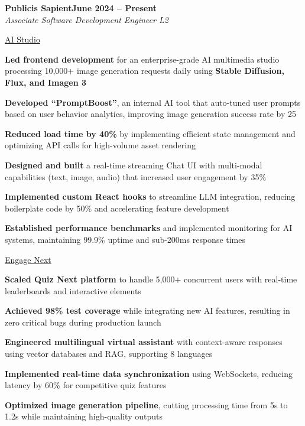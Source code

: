 \documentclass[letterpaper,10pt]{article}
\newcommand{\heading}[2]{
  \hspace{10pt}#1\hfill#2\\
}
\newcommand{\headingBf}[2]{
  \heading{\textbf{#1}}{\textbf{#2}}
}
\newcommand{\headingIt}[2]{
  \heading{\textit{#1}}{\textit{#2}}
}
\newenvironment{resume_list}{
  \vspace{-7pt}
  \begin{itemize}[itemsep=-2px, parsep=1pt, leftmargin=30pt]
}{
  \end{itemize}
}
\newcommand{\itemTitle}[1]{
  \item[] \underline{#1}\vspace{4pt}
}
\begin{document}
  \headingBf{Publicis Sapient}{June 2024 -- Present}
  \headingIt{Associate Software Development Engineer L2}{}
  \begin{resume_list}
    \itemTitle{AI Studio}
    \item \textbf{Led frontend development} for an enterprise-grade AI multimedia studio processing 10,000+ image generation requests daily using \textbf{Stable Diffusion, Flux, and Imagen 3}
    \item \textbf{Developed “PromptBoost”}, an internal AI tool that auto-tuned user prompts based on user behavior analytics, improving image generation success rate by 25%
    \item \textbf{Reduced load time by 40\%} by implementing efficient state management and optimizing API calls for high-volume asset rendering
    \item \textbf{Designed and built} a real-time streaming Chat UI with multi-modal capabilities (text, image, audio) that increased user engagement by 35\%
    \item \textbf{Implemented custom React hooks} to streamline LLM integration, reducing boilerplate code by 50\% and accelerating feature development
    \item \textbf{Established performance benchmarks} and implemented monitoring for AI systems, maintaining 99.9\% uptime and sub-200ms response times
  \end{resume_list}
  \begin{resume_list}
    \itemTitle{Engage Next}
    \item \textbf{Scaled Quiz Next platform} to handle 5,000+ concurrent users with real-time leaderboards and interactive elements
    \item \textbf{Achieved 98\% test coverage} while integrating new AI features, resulting in zero critical bugs during production launch
    \item \textbf{Engineered multilingual virtual assistant} with context-aware responses using vector databases and RAG, supporting 8 languages
    \item \textbf{Implemented real-time data synchronization} using WebSockets, reducing latency by 60\% for competitive quiz features
    \item \textbf{Optimized image generation pipeline}, cutting processing time from 5s to 1.2s while maintaining high-quality outputs
  \end{resume_list}
\end{document}
